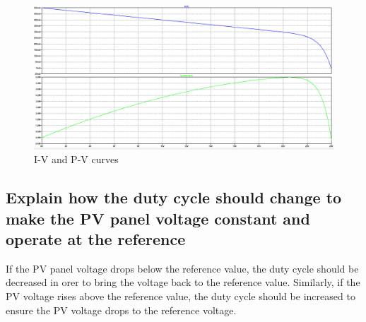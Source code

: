 \documentclass[]{article}
\begin{document}
       	\begin{figure}[H]
       		\centering
        	\includegraphics[width=\textwidth]{IVCurve}
        	\caption{I-V and P-V curves}
        	\label{fig:IVCurve}
        \end{figure}
    \subsection{Explain how the duty cycle should change to make the PV panel voltage constant and operate at the reference}
        If the PV panel voltage drops below the reference value, the duty cycle should be decreased in orer to bring the voltage back to the reference value. Similarly, if the PV voltage rises above the reference value, the duty cycle should be increased to ensure the PV voltage drops to the reference voltage.
\end{document}
